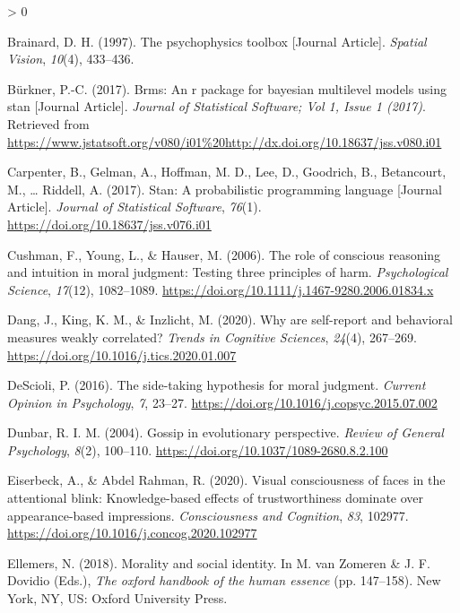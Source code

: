 \documentclass[
  english,
  man]{apa6}
\newlength{\cslhangindent}
\newenvironment{CSLReferences}[2] %
 {%
  \setlength{\parindent}{0pt}
  \ifodd #1 \everypar{\setlength{\hangindent}{\cslhangindent}}\ignorespaces\fi
  \ifnum #2 > 0
  \setlength{\parskip}{#2\baselineskip}
  \fi
 }%
 {}
\begin{document}
\begin{CSLReferences}{1}{0}
\leavevmode\hypertarget{ref-Brainard_1997}{}%
Brainard, D. H. (1997). The psychophysics toolbox {[}Journal Article{]}. \emph{Spatial Vision}, \emph{10}(4), 433--436.

\leavevmode\hypertarget{ref-Buxfcrkner_2017}{}%
Bürkner, P.-C. (2017). Brms: An r package for bayesian multilevel models using stan {[}Journal Article{]}. \emph{Journal of Statistical Software; Vol 1, Issue 1 (2017)}. Retrieved from \url{https://www.jstatsoft.org/v080/i01\%20http://dx.doi.org/10.18637/jss.v080.i01}

\leavevmode\hypertarget{ref-Carpenter_2017_stan}{}%
Carpenter, B., Gelman, A., Hoffman, M. D., Lee, D., Goodrich, B., Betancourt, M., \ldots{} Riddell, A. (2017). Stan: A probabilistic programming language {[}Journal Article{]}. \emph{Journal of Statistical Software}, \emph{76}(1). \url{https://doi.org/10.18637/jss.v076.i01}

\leavevmode\hypertarget{ref-cushman_role_2006}{}%
Cushman, F., Young, L., \& Hauser, M. (2006). The role of conscious reasoning and intuition in moral judgment: Testing three principles of harm. \emph{Psychological Science}, \emph{17}(12), 1082--1089. \url{https://doi.org/10.1111/j.1467-9280.2006.01834.x}

\leavevmode\hypertarget{ref-dang_why_2020}{}%
Dang, J., King, K. M., \& Inzlicht, M. (2020). Why are self-report and behavioral measures weakly correlated? \emph{Trends in Cognitive Sciences}, \emph{24}(4), 267--269. \url{https://doi.org/10.1016/j.tics.2020.01.007}

\leavevmode\hypertarget{ref-descioli_side-taking_2016}{}%
DeScioli, P. (2016). The side-taking hypothesis for moral judgment. \emph{Current Opinion in Psychology}, \emph{7}, 23--27. \url{https://doi.org/10.1016/j.copsyc.2015.07.002}

\leavevmode\hypertarget{ref-dunbar_gossip_2004}{}%
Dunbar, R. I. M. (2004). Gossip in evolutionary perspective. \emph{Review of General Psychology}, \emph{8}(2), 100--110. \url{https://doi.org/10.1037/1089-2680.8.2.100}

\leavevmode\hypertarget{ref-eiserbeck_visual_2020}{}%
Eiserbeck, A., \& Abdel Rahman, R. (2020). Visual consciousness of faces in the attentional blink: Knowledge-based effects of trustworthiness dominate over appearance-based impressions. \emph{Consciousness and Cognition}, \emph{83}, 102977. \url{https://doi.org/10.1016/j.concog.2020.102977}

\leavevmode\hypertarget{ref-ellemers_morality_2018}{}%
Ellemers, N. (2018). Morality and social identity. In M. van Zomeren \& J. F. Dovidio (Eds.), \emph{The oxford handbook of the human essence} (pp. 147--158). New York, {NY}, {US}: Oxford University Press.


\end{CSLReferences}
\end{document}
